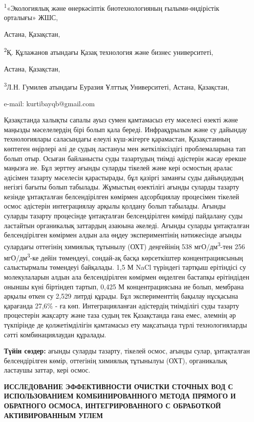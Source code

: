 \textsuperscript{1}«Экологиялық және өнеркәсіптік биотехнологияның
ғылыми-өндірістік орталығы» ЖШС,

Астана, Қазақстан,

\textsuperscript{2}Қ. Құлажанов атындағы Қазақ технология және бизнес
университеті,

Астана, Қазақстан,

\textsuperscript{3}Л.Н. Гумилев атындағы Еуразия Ұлттық Университеті,
Астана, Қазақстан,

e-mail: kurtibayqb@gmail.com

Қазақстанда халықты сапалы ауыз сумен қамтамасыз ету мәселесі өзекті
және маңызды мәселелердің бірі болып қала береді. Инфрақұрылым және су
дайындау технологиялары саласындағы елеулі күш-жігерге қарамастан,
Қазақстанның көптеген өңірлері әлі де судың ластануы мен жеткіліксіздігі
проблемаларына тап болып отыр. Осыған байланысты суды тазартудың тиімді
әдістерін жасау ерекше маңызға ие. Бұл зерттеу ағынды суларды тікелей
және кері осмостың аралас әдісімен тазарту мәселесін қарастырады, бұл
қазіргі заманғы суды дайындаудың негізгі бағыты болып табылады. Жұмыстың
өзектілігі ағынды суларды тазарту кезінде ұнтақталған белсендірілген
көмірмен адсорбциялау процесімен тікелей осмос әдістерін интеграциялау
арқылы қолдану болып табылады. Ағынды суларды тазарту процесінде
ұнтақталған белсендірілген көмірді пайдалану суды ластайтын органикалық
заттардың азаюына әкеледі. Ағынды суларды ұнтақталған белсендірілген
көмірмен алдын ала өңдеу экспериментінің нәтижесінде ағынды сулардағы
оттегінің химиялық тұтынылу (ОХТ) деңгейінің 538
мгО/дм\textsuperscript{3}-тен 256 мгО/дм\textsuperscript{3}-ке дейін
төмендеуі, сондай-ақ басқа көрсеткіштер концентрациясының салыстырмалы
төмендеуі байқалады. 1,5 М NaCl түріндегі тартқыш ерітіндісі су
молекулаларын алдын ала белсендірілген көмірмен өңделген бастапқы
ерітіндіден оныншы күні біртіндеп тартып, 0,425 М концентрациясына ие
болып, мембрана арқылы өткен су 2,529 литрді құрады. Бұл эксперименттің
бақылау нұсқасына қарағанда 27,6\% - ға көп. Интеграцияланған әдістердің
тиімділігі суды тазарту процестерін жақсарту және таза судың тек
Қазақстанда ғана емес, әлемнің әр түкпірінде де қолжетімділігін
қамтамасыз ету мақсатында түрлі технологияларды сәтті комбинациялаудан
құралады.

{\bfseries Түйін сөздер:} ағынды суларды тазарту, тікелей осмос, ағынды
сулар, ұнтақталған белсендірілген көмір, оттегінің химиялық тұтынылуы
(ОХТ), органикалық ластаушы заттар, кері осмос.

{\bfseries ИССЛЕДОВАНИЕ ЭФФЕКТИВНОСТИ ОЧИСТКИ СТОЧНЫХ ВОД С ИСПОЛЬЗОВАНИЕМ
КОМБИНИРОВАННОГО МЕТОДА ПРЯМОГО И ОБРАТНОГО ОСМОСА, ИНТЕГРИРОВАННОГО С
ОБРАБОТКОЙ АКТИВИРОВАННЫМ УГЛЕМ}

